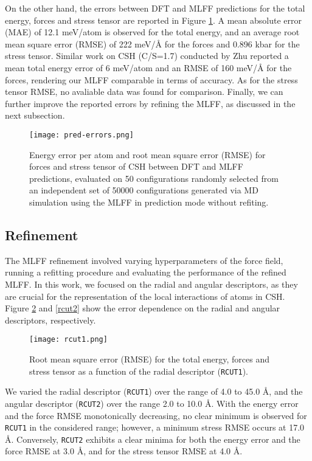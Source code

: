 On the other hand, the errors between DFT and MLFF predictions for the total energy, forces and stress tensor are reported in Figure \ref{pred-errors}. A mean absolute error (MAE) of 12.1 meV/atom is observed for the total energy, and an average root mean square error (RMSE) of 222 meV/Å for the forces and 0.896 kbar for the stress tensor. Similar work on CSH (C/S=1.7) conducted by Zhu \supercite{Zhu2024} reported a mean total energy error of 6 meV/atom and an RMSE of 160 meV/Å for the forces, rendering our MLFF comparable in terms of accuracy. As for the stress tensor RMSE, no avaliable data was found for comparison. Finally, we can further improve the reported errors by refining the MLFF, as discussed in the next subsection.

\begin{figure}[h]
    \centering
    \texttt{[image: pred-errors.png]}
    \caption{
    Energy error per atom and root mean square error (RMSE) for forces and stress tensor of CSH between DFT and MLFF predictions, evaluated on 50 configurations randomly selected from an independent set of 50000 configurations generated via MD simulation using the MLFF in prediction mode without refiting. 
    }
    \label{pred-errors}
\end{figure}

\subsection{Refinement}
The MLFF refinement involved varying hyperparameters of the force field, running a refitting procedure and evaluating the performance of the refined MLFF. In this work, we focused on the radial and angular descriptors, as they are crucial for the representation of the local interactions of atoms in CSH. Figure \ref{rcut1} and \ref{rcut2} show the error dependence on the radial and angular descriptors, respectively. 

\begin{figure}[h]
    \centering
    \texttt{[image: rcut1.png]}
    \caption{
    Root mean square error (RMSE) for the total energy, forces and stress tensor as a function of the radial descriptor (\texttt{RCUT1}). 
    }
    \label{rcut1}
\end{figure}
We varied the radial descriptor (\texttt{RCUT1}) over the range of 4.0 to 45.0 Å, and the angular descriptor (\texttt{RCUT2}) over the range 2.0 to 10.0 Å. With the energy error and the force RMSE monotonically decreasing, no clear minimum is observed for \texttt{RCUT1} in the considered range; however, a minimum stress RMSE occurs at 17.0 \AA. Conversely, \texttt{RCUT2} exhibits a clear minima for both the energy error and the force RMSE at 3.0 \AA, and for the stress tensor RMSE at 4.0 \AA.

